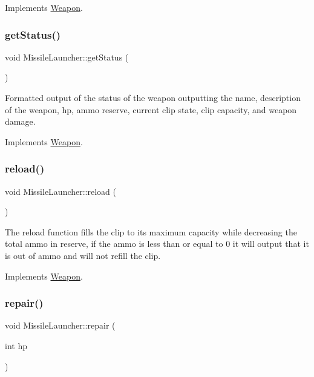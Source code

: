 Implements \hyperlink{classWeapon}{Weapon}.

\mbox{\label{classMissileLauncher_ab5b475faf878e4f019dedde6cfbd9b88}} 
\subsubsection{\texorpdfstring{get\+Status()}{getStatus()}}
{\footnotesize\ttfamily void Missile\+Launcher\+::get\+Status (\begin{DoxyParamCaption}{ }\end{DoxyParamCaption})\hspace{0.3cm}{\ttfamily [virtual]}}

Formatted output of the status of the weapon outputting the name, description of the weapon, hp, ammo reserve, current clip state, clip capacity, and weapon damage. 

Implements \hyperlink{classWeapon}{Weapon}.

\mbox{\label{classMissileLauncher_abf44b5e3a53a77f8df0084264e775f7b}} 
\subsubsection{\texorpdfstring{reload()}{reload()}}
{\footnotesize\ttfamily void Missile\+Launcher\+::reload (\begin{DoxyParamCaption}{ }\end{DoxyParamCaption})\hspace{0.3cm}{\ttfamily [virtual]}}

The reload function fills the clip to its maximum capacity while decreasing the total ammo in reserve, if the ammo is less than or equal to 0 it will output that it is out of ammo and will not refill the clip. 

Implements \hyperlink{classWeapon}{Weapon}.

\mbox{\label{classMissileLauncher_ade3b7a73dee2fd60b82e1637036c1c7b}} 
\subsubsection{\texorpdfstring{repair()}{repair()}}
{\footnotesize\ttfamily void Missile\+Launcher\+::repair (\begin{DoxyParamCaption}\item[{int}]{hp }\end{DoxyParamCaption})\hspace{0.3cm}{\ttfamily [virtual]}}


